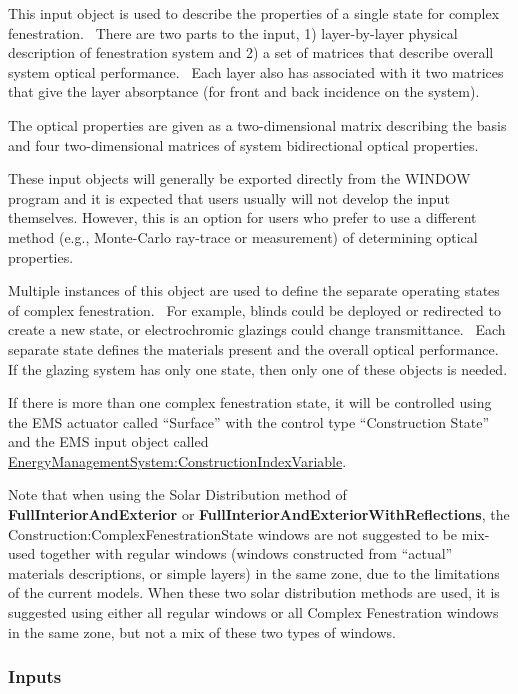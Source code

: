 This input object is used to describe the properties of a single state for complex fenestration.~ There are two parts to the input, 1) layer-by-layer physical description of fenestration system and 2) a set of matrices that describe overall system optical performance.~ Each layer also has associated with it two matrices that give the layer absorptance (for front and back incidence on the system).

The optical properties are given as a two-dimensional matrix describing the basis and four two-dimensional matrices of system bidirectional optical properties.

These input objects will generally be exported directly from the WINDOW program and it is expected that users usually will not develop the input themselves. However, this is an option for users who prefer to use a different method (e.g., Monte-Carlo ray-trace or measurement) of determining optical properties.

Multiple instances of this object are used to define the separate operating states of complex fenestration.~ For example, blinds could be deployed or redirected to create a new state, or electrochromic glazings could change transmittance.~ Each separate state defines the materials present and the overall optical performance.~ If the glazing system has only one state, then only one of these objects is needed.

If there is more than one complex fenestration state, it will be controlled using the EMS actuator called ``Surface'' with the control type ``Construction State'' and the EMS input object called \hyperref[energymanagementsystemconstructionindexvariable]{EnergyManagementSystem:ConstructionIndexVariable}.

Note that when using the Solar Distribution method of \textbf{FullInteriorAndExterior} or \textbf{FullInteriorAndExteriorWithReflections}, the Construction:ComplexFenestrationState windows are not suggested to be mix-used together with regular windows (windows constructed from ``actual'' materials descriptions, or simple layers) in the same zone, due to the limitations of the current models. When these two solar distribution methods are used, it is suggested using either all regular windows or all Complex Fenestration windows in the same zone, but not a mix of these two types of windows.

\subsubsection{Inputs}\label{inputs-39}

